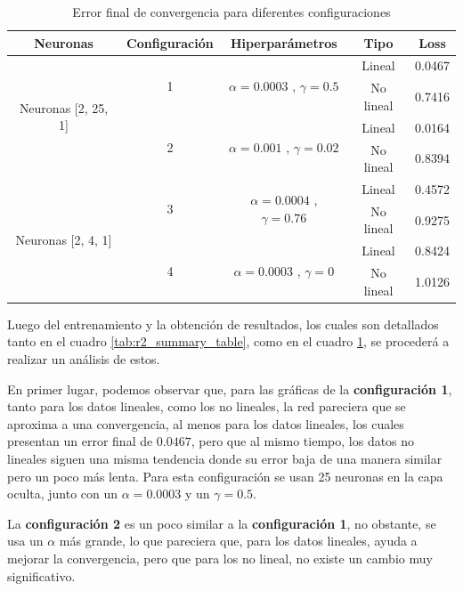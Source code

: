 \documentclass{article}
\begin{document}
\newpage
\begin{table}[h!]
\centering
\begin{tabular}{c|c|c|c|c}
\hline
\textbf{Neuronas} & \textbf{Configuración} & \textbf{Hiperparámetros} & \textbf{Tipo} & \textbf{Loss} \\ 
\hline
\multirow{4}{*}{Neuronas {[}2, 25, 1{]}} & \multirow{2}{*}{1} & \multirow{2}{*}{$\alpha=0.0003$ , $\gamma=0.5$} & Lineal & 0.0467 \\  
 & & & No lineal & 0.7416 \\ 
 \cline{2-5}
 & \multirow{2}{*}{2} & \multirow{2}{*}{$\alpha=0.001$ , $\gamma=0.02$} &  Lineal & 0.0164 \\ 
 & & & No lineal & 0.8394 \\ 
 \hline
\multirow{4}{*}{Neuronas [2, 4, 1]} & \multirow{2}{*}{3} & \multirow{2}{*}{$\alpha=0.0004$ , $\gamma=0.76$ } & Lineal & 0.4572 \\ 
 & & & No lineal & 0.9275 \\ 
 \cline{2-5}
 & \multirow{2}{*}{4} & \multirow{2}{*}{$\alpha=0.0003$ , $\gamma=0$} & Lineal & 0.8424 \\ 
 & & & No lineal & 1.0126 \\ 
 \hline
\end{tabular}

\caption{Error final de convergencia para diferentes configuraciones}
\label{tab:error_convergence_r2}
\end{table}

Luego del entrenamiento y la obtención de resultados, los cuales son detallados tanto en el cuadro \ref{tab:r2_summary_table}, como en el cuadro \ref{tab:error_convergence_r2}, se procederá a realizar un análisis de estos. 

En primer lugar, podemos observar que, para las gráficas de la \textbf{configuración 1}, tanto para los datos lineales, como los no lineales, la red pareciera que se aproxima a una convergencia, al menos para los datos lineales, los cuales presentan un error final de $0.0467$, pero que al mismo tiempo, los datos no lineales siguen una misma tendencia donde su error baja de una manera similar pero un poco más lenta. Para esta configuración se usan 25 neuronas en la capa oculta, junto con un $\alpha=0.0003$ y un $\gamma=0.5$. 

La \textbf{configuración 2} es un poco similar a la \textbf{configuración 1}, no obstante, se usa un $\alpha$ más grande, lo que pareciera que, para los datos lineales, ayuda a mejorar la convergencia, pero que para los no lineal, no existe un cambio muy significativo. 
\end{document}
